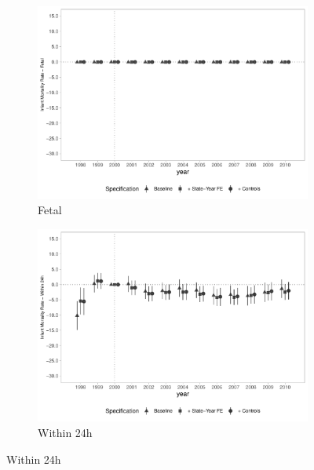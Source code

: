 \begin{figure}[h]
    \begin{center}
    \caption{Causal Effects on Infant Mortality Rates - By Timing}\label{fig:imr2}
    \begin{subfigure}{0.48\textwidth}
        \caption{\scriptsize Fetal}\label{fig:imr2_a}
        \centering
        \includegraphics[width=\textwidth]{plots/IMR/tx_mi_fet_dist_ec29_baseline_dist_ec29_baseline_full.pdf}
    \end{subfigure}
    \begin{subfigure}{0.48\textwidth}
        \centering
        \caption{\scriptsize Within 24h}\label{fig:imr2_b}
        \includegraphics[width=\textwidth]{plots/IMR/tx_mi_24h_dist_ec29_baseline_dist_ec29_baseline_full.pdf}
    \end{subfigure}

\end{center}
\end{figure}

